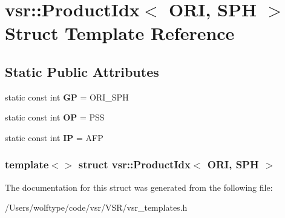 \hypertarget{structvsr_1_1_product_idx_3_01_o_r_i_00_01_s_p_h_01_4}{\section{vsr\-:\-:Product\-Idx$<$ O\-R\-I, S\-P\-H $>$ Struct Template Reference}
\label{structvsr_1_1_product_idx_3_01_o_r_i_00_01_s_p_h_01_4}
}
\subsection*{Static Public Attributes}
\begin{DoxyCompactItemize}
\item 
\hypertarget{structvsr_1_1_product_idx_3_01_o_r_i_00_01_s_p_h_01_4_a0c2a36c2aaa803e143ebeb264b3fac4d}{static const int {\bfseries G\-P} = O\-R\-I\-\_\-\-S\-P\-H}\label{structvsr_1_1_product_idx_3_01_o_r_i_00_01_s_p_h_01_4_a0c2a36c2aaa803e143ebeb264b3fac4d}

\item 
\hypertarget{structvsr_1_1_product_idx_3_01_o_r_i_00_01_s_p_h_01_4_a999a119c9a05640758770a24d7230446}{static const int {\bfseries O\-P} = P\-S\-S}\label{structvsr_1_1_product_idx_3_01_o_r_i_00_01_s_p_h_01_4_a999a119c9a05640758770a24d7230446}

\item 
\hypertarget{structvsr_1_1_product_idx_3_01_o_r_i_00_01_s_p_h_01_4_af8ac72bed2fb261ed914156a46e5388f}{static const int {\bfseries I\-P} = A\-F\-P}\label{structvsr_1_1_product_idx_3_01_o_r_i_00_01_s_p_h_01_4_af8ac72bed2fb261ed914156a46e5388f}

\end{DoxyCompactItemize}
\subsubsection*{template$<$$>$ struct vsr\-::\-Product\-Idx$<$ O\-R\-I, S\-P\-H $>$}



The documentation for this struct was generated from the following file\-:\begin{DoxyCompactItemize}
\item 
/\-Users/wolftype/code/vsr/\-V\-S\-R/vsr\-\_\-templates.\-h\end{DoxyCompactItemize}
